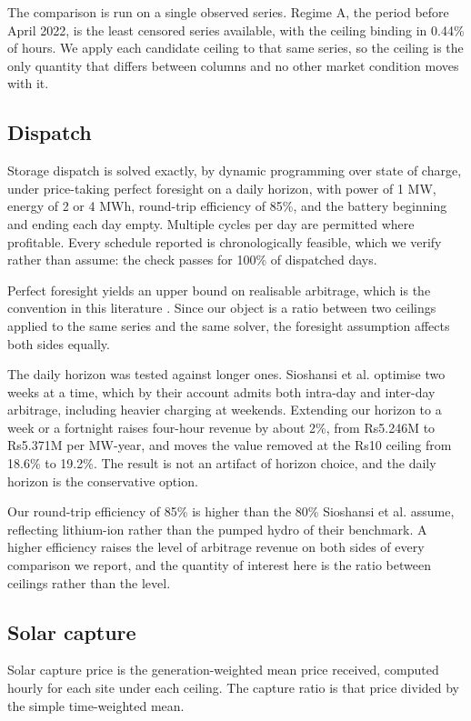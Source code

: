 \documentclass[conference,a4paper]{IEEEtran}
\begin{document}
The comparison is run on a single observed series. Regime A, the period before
April 2022, is the least censored series available, with the ceiling binding in
0.44\% of hours. We apply each candidate ceiling to that same series, so the
ceiling is the only quantity that differs between columns and no other market
condition moves with it.

\subsection{Dispatch}

Storage dispatch is solved exactly, by dynamic programming over state of charge,
under price-taking perfect foresight on a daily horizon, with power of 1 MW,
energy of 2 or 4 MWh, round-trip efficiency of 85\%, and the battery beginning
and ending each day empty. Multiple cycles per day are permitted where
profitable. Every schedule reported is chronologically feasible, which we verify
rather than assume: the check passes for 100\% of dispatched days.

Perfect foresight yields an upper bound on realisable arbitrage, which is the
convention in this literature \cite{sioshansi2009, antweiler2021}. Since our
object is a ratio between two ceilings applied to the same series and the same
solver, the foresight assumption affects both sides equally.

The daily horizon was tested against longer ones. Sioshansi et al. optimise two
weeks at a time, which by their account admits both intra-day and inter-day
arbitrage, including heavier charging at weekends. Extending our horizon to a
week or a fortnight raises four-hour revenue by about 2\%, from Rs5.246M to
Rs5.371M per MW-year, and moves the value removed at the Rs10 ceiling from
18.6\% to 19.2\%. The result is not an artifact of horizon choice, and the daily
horizon is the conservative option.

Our round-trip efficiency of 85\% is higher than the 80\% Sioshansi et al.
assume, reflecting lithium-ion rather than the pumped hydro of their benchmark.
A higher efficiency raises the level of arbitrage revenue on both sides of every
comparison we report, and the quantity of interest here is the ratio between
ceilings rather than the level.

\subsection{Solar capture}

Solar capture price is the generation-weighted mean price received, computed
hourly for each site under each ceiling. The capture ratio is that price divided
by the simple time-weighted mean.
\end{document}
